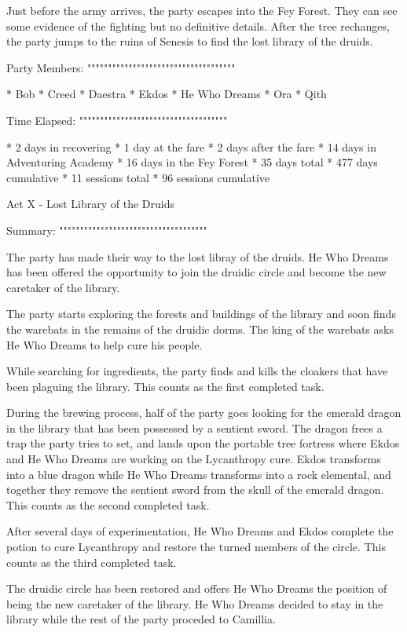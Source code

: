 Just before the army arrives, the party escapes into the Fey Forest.
They can see some evidence of the fighting but no definitive details.
After the tree rechanges, the party jumps to the ruins of Senesis to find the lost library of the druids.

Party Members:
""""""""""""""""""""""""""""""""""""

  * Bob
  * Creed
  * Daestra
  * Ekdos
  * He Who Dreams
  * Ora
  * Qith

Time Elapsed:
""""""""""""""""""""""""""""""""""""

  * 2 days in recovering
  * 1 day at the fare
  * 2 days after the fare
  * 14 days in Adventuring Academy
  * 16 days in the Fey Forest
  * 35 days total
  * 477 days cumulative
  * 11 sessions total
  * 96 sessions cumulative

Act X - Lost Library of the Druids
^^^^^^^^^^^^^^^^^^^^^^^^^^^^^^^^^^^^

Summary:
""""""""""""""""""""""""""""""""""""

The party has made their way to the lost libray of the druids.
He Who Dreams has been offered the opportunity to join the druidic circle and become the new caretaker of the library.

The party starts exploring the forests and buildings of the library and soon finds the warebats in the remains of the druidic dorms.
The king of the warebats asks He Who Dreams to help cure his people.

While searching for ingredients, the party finds and kills the cloakers that have been plaguing the library.
This counts as the first completed task.

During the brewing process, half of the party goes looking for the emerald dragon in the library that has been possessed by a sentient sword.
The dragon frees a trap the party tries to set, and lands upon the portable tree fortress where Ekdos and He Who Dreams are working on the Lycanthropy cure.
Ekdos transforms into a blue dragon while He Who Dreams transforms into a rock elemental, and together they remove the sentient sword from the skull of the emerald dragon.
This counts as the second completed task.

After several days of experimentation, He Who Dreams and Ekdos complete the potion to cure Lycanthropy and restore the turned members of the circle.
This counts as the third completed task.

The druidic circle has been restored and offers He Who Dreams the position of being the new caretaker of the library.
He Who Dreams decided to stay in the library while the rest of the party proceded to Camillia.

